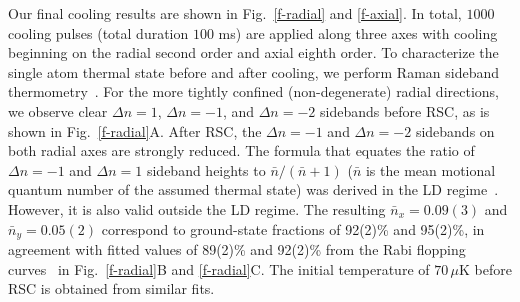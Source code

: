 \documentclass[aps,prl,twocolumn,groupedaddress]{revtex4-1}
\begin{document}
Our final cooling results are shown in Fig.~\ref{f-radial} and \ref{f-axial}.
In total, $1000$ cooling pulses (total duration $100$ ms) are applied
along three axes with cooling beginning on the radial second order and axial eighth order.
To characterize the single atom thermal state before and after cooling,
we perform Raman sideband thermometry~\cite{Monroe1995, Meekhof1996}.
For the more tightly confined (non-degenerate) radial directions,
we observe clear $\Delta n=1$, $\Delta n=-1$, and $\Delta n=-2$ sidebands before RSC, as is shown in Fig.~\ref{f-radial}A.
After RSC, the $\Delta n=-1$ and $\Delta n=-2$ sidebands on both radial axes are strongly reduced.
The formula that equates the ratio of $\Delta n=-1$ and $\Delta n=1$ sideband heights to $\bar{n}/(\bar{n}+1)$ ($\bar{n}$ is the mean motional quantum number of the assumed thermal state) was  derived in the LD regime~\cite{Monroe1995}. However, it is also valid outside the LD regime.  The resulting $\bar{n}_x=0.09(3)$ and $\bar{n}_y=0.05(2)$ correspond to ground-state fractions of 92(2)\% and 95(2)\%,  in agreement with fitted values of 89(2)\% and 92(2)\% from the Rabi flopping curves~ \cite{Meekhof1996} in Fig.~\ref{f-radial}B and \ref{f-radial}C.
The initial temperature of $70\,\mu$K before RSC is obtained
from similar fits. %
\end{document}
